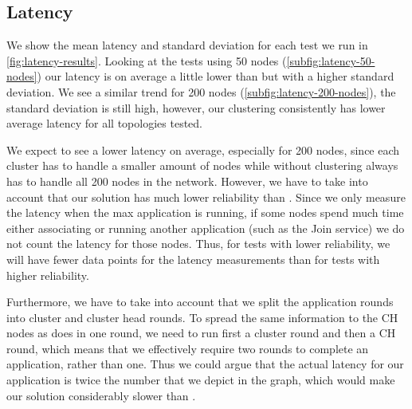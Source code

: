 \subsection{Latency}
We show the mean latency and standard deviation for each test we run in \cref{fig:latency-results}. Looking at the tests using 50 nodes (\cref{subfig:latency-50-nodes}) our latency is on average a little lower than \atwo{} but with a higher standard deviation. We see a similar trend for 200 nodes (\cref{subfig:latency-200-nodes}), the standard deviation is still high, however, our clustering consistently has lower average latency for all topologies tested. 

We expect to see a lower latency on average, especially for 200 nodes, since each cluster has to handle a smaller amount of nodes while \atwo{} without clustering always has to handle all 200 nodes in the network. However, we have to take into account that our solution has much lower reliability than \atwo{}. Since we only measure the latency when the max application is running, if some nodes spend much time either associating or running another application (such as the Join service) we do not count the latency for those nodes. Thus, for tests with lower reliability, we will have fewer data points for the latency measurements than for tests with higher reliability.

Furthermore, we have to take into account that we split the application rounds into cluster and cluster head rounds. To spread the same information to the CH nodes as \atwo{} does in one round, we need to run first a cluster round and then a CH round, which means that we effectively require two rounds to complete an application, rather than one. Thus we could argue that the actual latency for our application is twice the number that we depict in the graph, which would make our solution considerably slower than \atwo{}.

